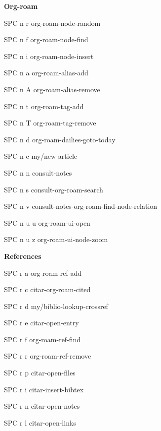 \documentclass[10pt]{article}
\renewcommand\subsubsection[1]{\smallskip\par\textbf{\color{heading}\small#1}}
\begin{document}
\begin{multicols}{4}
  \subsubsection{Org-roam}
  \begin{keylist}
    \item[SPC n r] org-roam-node-random
    \item[SPC n f] org-roam-node-find
    \item[SPC n i] org-roam-node-insert
    \item[SPC n a] org-roam-alias-add
    \item[SPC n A] org-roam-alias-remove
    \item[SPC n t] org-roam-tag-add
    \item[SPC n T] org-roam-tag-remove
    \item[SPC n d] org-roam-dailies-goto-today
    \item[SPC n c] my/new-article
    \item[SPC n n] consult-notes
    \item[SPC n s] consult-org-roam-search
    \item[SPC n v] consult-notes-org-roam-find-node-relation
    \item[SPC n u u] org-roam-ui-open
    \item[SPC n u z] org-roam-ui-node-zoom
  \end{keylist}
  \subsubsection{References}
  \begin{keylist}
    \item[SPC r a] org-roam-ref-add
    \item[SPC r c] citar-org-roam-cited
    \item[SPC r d] my/biblio-lookup-crossref
    \item[SPC r e] citar-open-entry
    \item[SPC r f] org-roam-ref-find
    \item[SPC r r] org-roam-ref-remove
    \item[SPC r p] citar-open-files
    \item[SPC r i] citar-insert-bibtex
    \item[SPC r n] citar-open-notes
    \item[SPC r l] citar-open-links
  \end{keylist}

\end{multicols}
\end{document}
